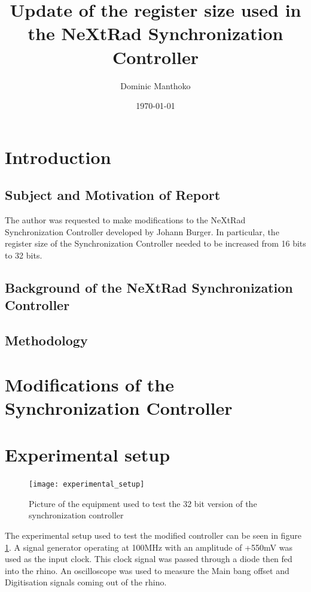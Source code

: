\documentclass[12pt, a4paper, twoside]{article}
\title{Update of the register size used in the NeXtRad Synchronization Controller}
\author{Dominic Manthoko}
\date{\today}
\begin{document}
\maketitle

\sloppy


\section{Introduction}

\subsection{Subject and Motivation of Report}
The author was requested to make modifications to the NeXtRad Synchronization Controller developed by Johann Burger. In particular, the register size of the Synchronization Controller needed to be increased from 16 bits to 32 bits. 

\subsection{Background of the NeXtRad Synchronization Controller}


\subsection{Methodology}

\section{Modifications of the Synchronization Controller}


\section{Experimental setup}

	\begin{figure}[h]
		\centering
		\texttt{[image: experimental\_setup]}
		\caption{Picture of the equipment used to test the 32 bit version of the synchronization controller}
		\label{fig:exp_setup}
	\end{figure}
	
The experimental setup used to test the modified controller can be seen in figure \ref{fig:exp_setup}. A signal generator operating at 100MHz with an amplitude of +550mV was used as the input clock. This clock signal was passed through a diode then fed into the rhino. An oscilloscope was used to measure the Main bang offset and Digitisation signals coming out of the rhino. 
	
\end{document}
